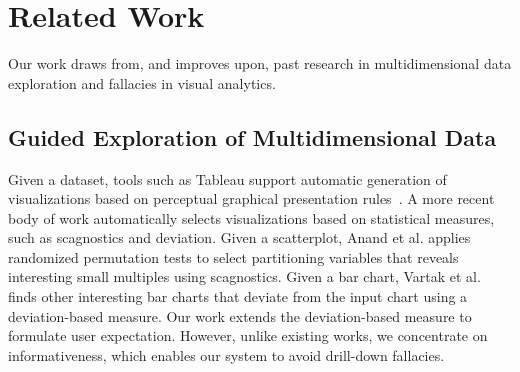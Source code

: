 \section{Related Work\label{sec:related}}
Our work draws from, and improves upon, past research in multidimensional data exploration and fallacies in visual analytics. 
\subsection{Guided Exploration of Multidimensional Data}
Given a dataset, tools such as Tableau support automatic generation of visualizations based on perceptual graphical presentation rules~\cite{Mackinlay2007,Wongsuphasawat2016}. A more recent body of work automatically selects visualizations based on statistical measures, such as scagnostics and deviation. Given a scatterplot, Anand et al. \cite{Anand2015} applies randomized permutation tests to select partitioning variables that reveals interesting small multiples using scagnostics. Given a bar chart, Vartak et al. \cite{Vartak2015} finds other interesting bar charts that deviate from the input chart using a deviation-based measure. Our work extends the deviation-based measure to formulate user expectation. However, unlike existing works, we concentrate on informativeness, which enables our system to avoid drill-down fallacies.
